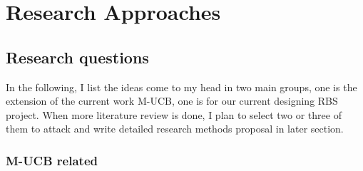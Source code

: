 

\chapter{Research Approaches} \label{chap-3}

\section{Research questions}

In the following, I list the ideas come to my head in two main groups, one is the extension of the current work M-UCB, one is for our current designing RBS project.  When more literature review is done, I plan to select two or three of them to attack and write detailed research methods proposal in later section. 

\subsection{M-UCB related}

